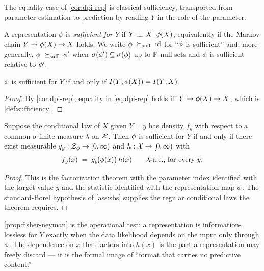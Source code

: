 The equality case of \cref{cor:dpi-rep} is classical sufficiency, transported
from parameter estimation to prediction by reading $Y$ in the role of the
parameter.

\begin{definition}
\label{def:sufficiency}
A representation $\phi$ is \emph{sufficient for $Y$} if
$Y \perp\!\!\!\perp X \,\vert\, \phi(X)$, equivalently if the Markov chain
$Y \rightarrow \phi(X) \rightarrow X$ holds. We write $\phi \;\succeq_{\mathrm{suff}}\; \mathrm{id}$ for
``$\phi$ is sufficient'' and, more generally, $\phi \;\succeq_{\mathrm{suff}}\; \phi'$ when
$\sigma\!\left(\phi'\right) \subseteq \sigma\!\left(\phi\right)$ up to $\mathbb{P}$-null sets and $\phi$ is
sufficient relative to $\phi'$.
\end{definition}

\begin{proposition}
\label{prop:suff-iff-mi}
$\phi$ is sufficient for $Y$ if and only if $I(Y ; \phi(X)) = I(Y ; X)$.
\end{proposition}

\begin{proof}
By \cref{cor:dpi-rep}, equality in \eqref{eq:dpi-rep} holds iff
$Y \rightarrow \phi(X) \rightarrow X$, which is \cref{def:sufficiency}.
\end{proof}

\begin{proposition}
\label{prop:fisher-neyman}
Suppose the conditional law of $X$ given $Y=y$ has density $f_y$ with respect
to a common $\sigma$-finite measure $\lambda$ on $\mathcal{X}$. Then $\phi$ is
sufficient for $Y$ if and only if there exist measurable
$g_y : \mathcal{Z}_{\phi} \to [0,\infty)$ and $h : \mathcal{X} \to [0,\infty)$ with
\begin{equation}
  \label{eq:fisher-neyman}
  f_y(x) \;=\; g_y\!\big(\phi(x)\big)\, h(x)
  \qquad \lambda\text{-a.e., for every } y.
\end{equation}
\end{proposition}

\begin{proof}
This is the factorization theorem \citep[Thm.~1.6.5]{lehmanncasella1998} with
the parameter index identified with the target value $y$ and the statistic
identified with the representation map $\phi$. The standard-Borel hypothesis
of \cref{ass:sbs} supplies the regular conditional laws the theorem requires.
\end{proof}

\cref{prop:fisher-neyman} is the operational test: a representation is
information-lossless for $Y$ exactly when the data likelihood depends on the
input only through $\phi$. The dependence on $x$ that factors into $h(x)$ is
the part a representation may freely discard --- it is the formal image of
``format that carries no predictive content.''

